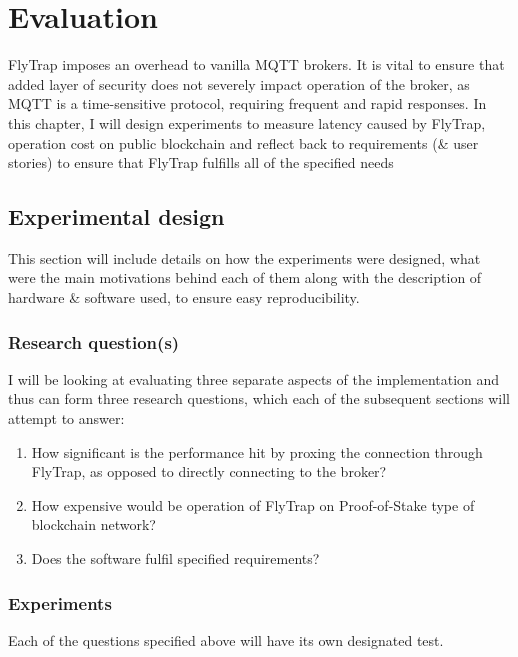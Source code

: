 \chapter{Evaluation}\label{chap:evaluation}
FlyTrap imposes an overhead to vanilla MQTT brokers. It is vital to ensure that added layer of security does not severely impact operation of the broker, as MQTT is a time-sensitive protocol, requiring frequent and rapid responses. In this chapter, I will design experiments to measure latency caused by FlyTrap, operation cost on public blockchain and reflect back to requirements (\& user stories) to ensure that FlyTrap fulfills all of the specified needs

\section{Experimental design}
This section will include details on how the experiments were designed, what were the main motivations behind each of them along with the description of hardware \& software used, to ensure easy reproducibility.
\subsection{Research question(s)}
I will be looking at evaluating three separate aspects of the implementation and thus can form three research questions, which each of the subsequent sections will attempt to answer:
\begin{enumerate}
  \item How significant is the performance hit by proxing the connection through FlyTrap, as opposed to directly connecting to the broker?
  \item How expensive would be operation of FlyTrap on Proof-of-Stake type of blockchain network?
  \item Does the software fulfil specified requirements?
\end{enumerate}
\subsection{Experiments}
Each of the questions specified above will have its own designated test.

